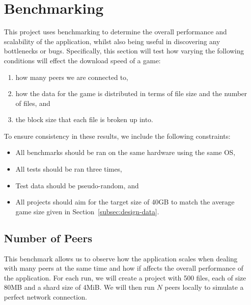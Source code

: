 
\newpage
\section{Benchmarking}\label{sec:benchmark}

This project uses benchmarking to determine the overall performance and scalability of the application, whilst also being useful in discovering any bottlenecks or bugs.
Specifically, this section will test how varying the following conditions will effect the download speed of a game:

\begin{enumerate}
  \item how many peers we are connected to,
  \item how the data for the game is distributed in terms of file size and the number of files, and
  \item the block size that each file is broken up into.
\end{enumerate}

\vspace{2mm}\noindent
To ensure consistency in these results, we include the following constraints:

\begin{itemize}
  \item All benchmarks should be ran on the same hardware using the same OS,
  \item All tests should be ran three times,
  \item Test data should be pseudo-random, and
  \item All projects should aim for the target size of 40GB to match the average game size given in Section~\ref{subsec:design-data}.
\end{itemize}

\subsection*{Number of Peers}

This benchmark allows us to observe how the application scales when dealing with many peers at the same time and how if affects the overall performance of the application.
\x
For each run, we will create a project with 500 files, each of size 80MB and a shard size of 4MiB. We will then run $N$ peers locally to simulate a perfect network connection.

